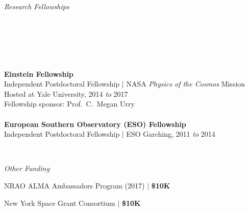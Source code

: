 \documentclass[11pt]{article}
\begin{document}
\vspace{6mm}


\hspace{2.5mm} \parbox{1.5in}{\textit{Research Fellowships \\ \\ \\ \\ \\ \\}} \parbox{5.15in}{\textbf{Einstein Fellowship} \\ Independent Postdoctoral Fellowship $|$ NASA \textit{Physics of the Cosmos} Mission
\\ Hosted at Yale University, 2014 \textit{to} 2017
\\ Fellowship sponsor: Prof.~C.~Megan Urry
\\ \\ \textbf{European Southern Observatory (ESO) Fellowship} \\ Independent Postdoctoral Fellowship $|$ ESO Garching, 2011 \textit{to} 2014} \\

\vspace{6mm}

\hspace{2.5mm} \parbox{1.5in}{\textit{Other Funding \\}}
\parbox{5.15in}{NRAO ALMA Ambassadors Program (2017) $|$ \textbf{\$10K}

New York Space Grant Consortium $|$ \textbf{\$10K}
}



\vspace{6mm}
\end{document}
